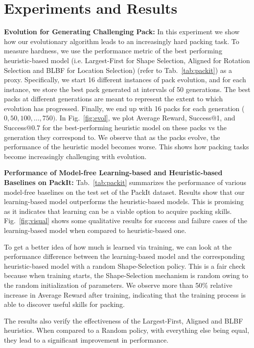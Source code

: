 \documentclass{article}
\begin{document}
\section{Experiments and Results}
\label{sec:experiments}
\noindent\textbf{Evolution for Generating Challenging Pack:} In this experiment we show how our evolutionary algorithm leads to an increasingly hard packing task. To measure hardness, we use the performance metric of the best performing heuristic-based model (i.e. Largest-First for Shape Selection, Aligned for Rotation Selection and BLBF for Location Selection) (refer to Tab.~\ref{tab:packit}) as a proxy. Specifically, we start 16 different instances of pack evolution, and for each instance, we store the best pack generated at intervals of 50 generations. The best packs at different generations are meant to represent the extent to which evolution has progressed. Finally, we end up with 16 packs for each  generation ($0, 50, 100, \dots, 750)$. In Fig.~\ref{fig:evol}, we plot Average Reward, Success@1, and Success@0.7 for the best-performing heuristic model on these packs vs the generation they correspond to. We observe that as the packs evolve, the performance of the heuristic model becomes worse. This shows how packing tasks become increasingly challenging with evolution.

\noindent\textbf{Performance of Model-free Learning-based and Heuristic-based Baselines on PackIt:} Tab.~\ref{tab:packit} summarizes the performance of various model-free baselines on the test set of the PackIt dataset. Results show that our learning-based model outperforms the heuristic-based models. This is promising as it indicates that learning can be a viable option to acquire packing skills. Fig.~\ref{fig:visual} shows some qualitative results for success and failure cases of the learning-based model when compared to heuristic-based one.

To get a better idea of how much is learned via training, we can look at the performance difference between the learning-based model and the corresponding heuristic-based model with a random Shape-Selection policy. This is a fair check because when training starts, the Shape-Selection mechanism is random owing to the random initialization of parameters. We observe more than 50\% relative increase in Average Reward after training, indicating that the training process is able to discover useful skills for packing.

The results also verify the effectiveness of the Largest-First, Aligned and BLBF heuristics. When compared to a Random policy, with everything else being equal, they lead to a significant improvement in performance. 
\end{document}

